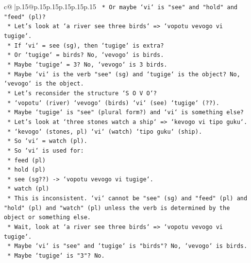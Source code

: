 \documentclass{article}
\begin{document}
{\begin{supertabular}{c@{$\;$}|p{.15\linewidth}@{}p{.15\linewidth}p{.15\linewidth}p{.15\linewidth}p{.15\linewidth}p{.15\linewidth}}
{{{\texttt{                *   Or maybe `vi` is "see" and "hold" and "feed" (pl)?} \\
\texttt{                *   Let's look at `a river see three birds` => `vopotu vevogo vi tugige`.} \\
\texttt{                *   If `vi` = see (sg), then `tugige` is extra?} \\
\texttt{                *   Or `tugige` = birds? No, `vevogo` is birds.} \\
\texttt{                *   Maybe `tugige` = 3? No, `vevogo` is 3 birds.} \\
\texttt{                *   Maybe `vi` is the verb "see" (sg) and `tugige` is the object? No, `vevogo` is the object.} \\
\texttt{                *   Let's reconsider the structure `S O V O`?} \\
\texttt{                *   `vopotu` (river) `vevogo` (birds) `vi` (see) `tugige` (??).} \\
\texttt{                *   Maybe `tugige` is "see" (plural form?) and `vi` is something else?} \\
\texttt{                *   Let's look at `three stones watch a ship` => `kevogo vi tipo guku`.} \\
\texttt{                *   `kevogo` (stones, pl) `vi` (watch) `tipo guku` (ship).} \\
\texttt{                *   So `vi` = watch (pl).} \\
\texttt{                *   So `vi` is used for:} \\
\texttt{                    *   feed (pl)} \\
\texttt{                    *   hold (pl)} \\
\texttt{                    *   see (sg??) {-}> `vopotu vevogo vi tugige`.} \\
\texttt{                    *   watch (pl)} \\
\texttt{                *   This is inconsistent. `vi` cannot be "see" (sg) and "feed" (pl) and "hold" (pl) and "watch" (pl) unless the verb is determined by the object or something else.} \\
\texttt{                *   Wait, look at `a river see three birds` => `vopotu vevogo vi tugige`.} \\
\texttt{                *   Maybe `vi` is "see" and `tugige` is "birds"? No, `vevogo` is birds.} \\
\texttt{                *   Maybe `tugige` is "3"? No.} \\
}}}
\end{supertabular}}
\end{document}
